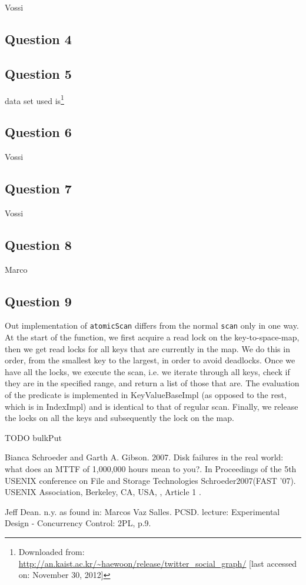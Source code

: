 \documentclass[12pt,a4paper]{article}
\begin{document}
Vossi

\subsection*{Question 4}
\label{sec:pq4}

\subsection*{Question 5}
\label{sec:pq5}

data set used is\footnote{Downloaded from: \url{http://an.kaist.ac.kr/~haewoon/release/twitter_social_graph/} [last accessed on: November 30, 2012]}

\subsection*{Question 6}
\label{sec:pq6}
Vossi

\subsection*{Question 7}
\label{sec:pq7} 
Vossi

\subsection*{Question 8}
\label{sec:pq8}
Marco

\subsection*{Question 9}
\label{sec:pq9}
Out implementation of \texttt{atomicScan} differs from the normal \texttt{scan} only in one way. At the start of the function, we first acquire a read lock on the key-to-space-map, then we get read locks for all keys that are currently in the map. We do this in order, from the smallest key to the largest, in order to avoid deadlocks. Once we have all the locks, we execute the scan, i.e. we iterate through all keys, check if they are in the specified range, and return a list of those that are. The evaluation of the predicate is implemented in KeyValueBaseImpl (as opposed to the rest, which is in IndexImpl) and is identical to that of regular scan. Finally, we release the locks on all the keys and subsequently the lock on the map.

TODO bulkPut

\begin{thebibliography}{1}

 Bianca Schroeder and Garth A. Gibson. 2007. Disk failures in the real world: what does an MTTF of 1,000,000 hours mean to you?. In Proceedings of the 5th USENIX conference on File and Storage Technologies Schroeder2007(FAST '07). USENIX Association, Berkeley, CA, USA, , Article 1 .

 Jeff Dean. n.y. as found in: Marcos Vaz Salles. PCSD. lecture: Experimental Design - Concurrency Control: 2PL, p.9.

\end{thebibliography}
\end{document}
